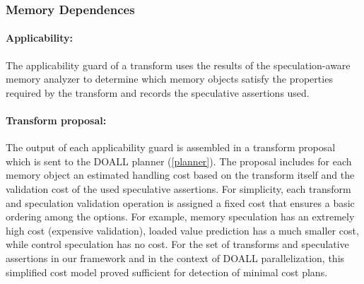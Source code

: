 
\subsubsection{Memory Dependences}


\paragraph{Applicability:}
%
The applicability guard of a transform uses the results of the
speculation-aware memory analyzer to determine which memory objects
satisfy the properties required by the transform and records the
speculative assertions used.
%

\paragraph{Transform proposal:} The output of each applicability
guard is assembled in a transform proposal which is sent to the
DOALL planner (\cref{planner}).
%
The proposal includes for each memory object an estimated handling
cost based on the transform itself and the validation cost of the
used speculative assertions.
%
%
For simplicity, each transform and speculation
validation operation is assigned a fixed
cost that ensures a basic ordering among the options. For
example,
memory speculation has an extremely high cost (expensive validation),
loaded value prediction has a much smaller cost, while
control speculation has no cost.
%
%
For the set of transforms and speculative assertions in our
framework and in the context of DOALL parallelization, this simplified
cost model proved sufficient for detection of minimal cost plans.


